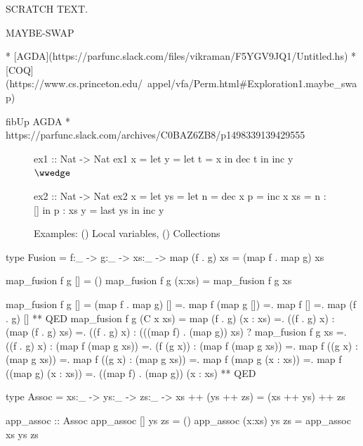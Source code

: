 SCRATCH TEXT.

MAYBE-SWAP

* [AGDA](https://parfunc.slack.com/files/vikraman/F5YGV9JQ1/Untitled.hs)
* [COQ](https://www.cs.princeton.edu/~appel/vfa/Perm.html#Exploration1.maybe_swap)

fibUp AGDA
* https://parfunc.slack.com/archives/C0BAZ6ZB8/p1498339139429555




\begin{figure}[t!]
\centering
\begin{minipage}[t]{0.30\textwidth}
\begin{codebox}
ex1 :: Nat -> Nat
ex1 x =
  let y =
    let t = x
    in
      dec t
  in
    inc y
$\wwedge$
\end{codebox}
\end{minipage}
\hspace{0.1in}
\begin{minipage}[t]{0.45\textwidth}
\begin{codebox}
ex2 :: Nat -> Nat
ex2 x =
  let ys = let n  = dec x
               p  = inc x
               xs = n : []
           in p : xs
      y  = last ys
  in
    inc y

\end{codebox}
\end{minipage}
\caption{Examples: () Local variables, () Collections}
\label{fig:ex1}
\label{fig:ex2}
\end{figure}


type Fusion = f:_ -> g:_ -> xs:_ ->
                {map (f . g) xs = (map f . map g) xs}

map_fusion f g []     = ()
map_fusion f g (x:xs) = map_fusion f g xs

map_fusion f g []
  =  (map f . map g) []
  =.  map f (map g [])
  =.  map f []
  =.  map (f . g) []
  **  QED
map_fusion f g (C x xs)
  =  map (f . g) (x : xs)
  =. ((f . g) x) : (map (f . g) xs)
  =. ((f . g) x) : (((map f) . (map g)) xs)
     ? map_fusion f g xs
  =. ((f . g) x) : (map f (map g xs))
  =. (f (g x)) : (map f (map g xs))
  =. map f ((g x) : (map g xs))
  =. map f ((g x) : (map g xs))
  =. map f (map g (x : xs))
  =. map f ((map g) (x : xs))
  =. ((map f) . (map g)) (x : xs)
  ** QED

type Assoc = xs:_ -> ys:_ -> zs:_ ->
              { xs ++ (ys ++ zs) = (xs ++ ys) ++ zs}

app_assoc              :: Assoc
app_assoc []     ys zs = ()
app_assoc (x:xs) ys zs = app_assoc xs ys zs


